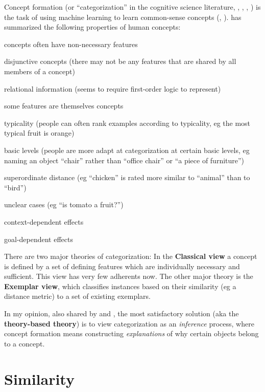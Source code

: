 Concept formation (or ``categorization'' in the cognitive science literature, \citep*{Murphy2002}, \citep*{Cohen2005}, \citep*{Margolis1999}, \citep*{Lakoff1987}) is the task of using machine learning to learn common-sense concepts (\citep*{Nakamura1993}, \citep*{Wrobel1994}).  \citep*{Wrobel1994} has summarized the following properties of human concepts:
\begin{compactenum}[1.]
\item concepts often have non-necessary features
\item disjunctive concepts (there may not be any features that are shared by all members of a concept)
\item relational information (seems to require first-order logic to represent)
\item some features are themselves concepts
\item typicality (people can often rank examples according to typicality, eg the most typical fruit is orange)
\item basic levels (people are more adapt at categorization at certain basic levels, eg naming an object ``chair'' rather than ``office chair'' or ``a piece of furniture'')
\item superordinate distance (eg ``chicken'' is rated more similar to ``animal'' than to ``bird'')
\item unclear cases (eg ``is tomato a fruit?'')
\item context-dependent effects
\item goal-dependent effects
\end{compactenum}

There are two major theories of categorization:  In the \textbf{Classical view} a concept is defined by a set of defining features which are individually necessary and sufficient.  This view has very few adherents now.  The other major theory is the \textbf{Exemplar view}, which classifies instances based on their similarity (eg a distance metric) to a set of existing exemplars.

In my opinion, also shared by \citep*{Murphy1985} and \citep*{Wrobel1994}, the most satisfactory solution (aka the \textbf{theory-based theory}) is to view categorization as an \textit{inference} process, where concept formation means constructing \textit{explanations} of why certain objects belong to a concept.

\section{Similarity}
\label{sec:similarity}

